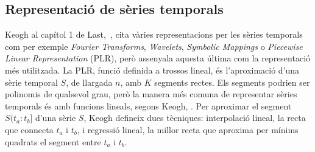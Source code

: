 





\subsection{Representació de sèries temporals}

Keogh al capítol 1 de Last,~\cite{last}, cita vàries representacions per les sèries temporals com per exemple \emph{Fourier Transforms}, \emph{Wavelets}, \emph{Symbolic Mappings} o \emph{Piecewise Linear Representation} (PLR), però assenyala aquesta última com la representació més utilitzada. 
La PLR, funció definida a trossos lineal, és l'aproximació d'una sèrie temporal $S$, de llargada $n$, amb $K$ segments rectes. Els segments podrien ser polinomis de qualsevol grau, però la manera més comuna de representar sèries temporals és amb funcions lineals, segons Keogh, \cite{keogh02}.
Per aproximar el segment $S(t_a:t_b]$ d'una sèrie $S$, Keogh defineix dues tècniques: interpolació lineal, la recta que connecta $t_a$ i $t_b$, i regressió lineal, la millor recta que aproxima per mínims quadrats el segment entre $t_a$ i $t_b$.


